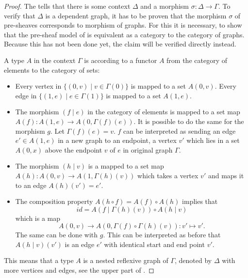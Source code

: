 \documentclass[12pt,a4paper,twoside,xetex]{book} %
\begin{document}
\begin{proof} 

The  tells that there is some context $\Delta$ and a morphism $\sigma : \Delta \rightarrow \Gamma$. To verify that $\Delta$ is a dependent graph, it has to be proven that the morphism $\sigma$ of pre-sheaves corresponds to morphism of graphs. For this it is necessary, to show that the pre-sheaf model of  is equivalent as a category to the category of graphs. Because this has not been done yet, the claim will be verified directly instead. 

A type $A$ in the context $\Gamma$ is according to  a functor $A$ from the category of elements to the category of sets:

\begin{itemize}
\item Every vertex in $\{ (0, v) \mid v \in \Gamma (0) \}$ is mapped to a set 
$A(0,v)$. Every edge in $\{ (1, e) \mid e \in \Gamma (1) \}$ is mapped to a set 
$A(1,e)$.

\item The morphism $(f \mid e)$ in the category of elements is mapped to a set 
map $A(f): A(1,e) \rightarrow A(0, \Gamma (f) (e))$.  It is possible to do the 
same for the morphism $g$. Let $\Gamma (f) (e) =v$. $f$ can be interpreted as 
sending an edge $e' \in A(1,e)$ in a new graph to an endpoint, a vertex $v'$ 
which lies in a set $A(0, x)$ above the endpoint $v$ of $e$ in original graph 
$\Gamma$.
 
\item The morphism $(h \mid v)$ is a mapped to a set map $A(h) : A(0,v) 
\rightarrow A(1, \Gamma (h) (v) )$ which takes a vertex $v'$ and maps it to an 
edge $A(h)(v')=e'$.

\item The composition property $A(h \circ f) = A(f) \circ A(h)$ implies that 
$$id = A \left( f \mid \Gamma (h) (v) \right) \circ A \left( h \mid v \right)$$ 
which is a map $$A(0,v) \rightarrow A(0, \Gamma (f) \circ \Gamma (h) (v)): v' 
\mapsto v'.$$ The same can be done with $g$. This can be interpreted as before 
that $A(h \mid v)(v')$ is an edge $e'$ with identical start and end point $v'$.
\end{itemize}

This means that a type $A$ is a nested reflexive graph of $\Gamma$, denoted by $\Delta$ with more 
vertices and edges, see the upper part of .



\end{proof}
\end{document}
